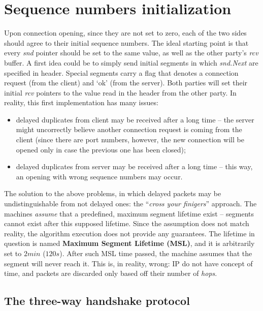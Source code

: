 \documentclass[a4paper, 11pt]{report}
\begin{document}
\section{Sequence numbers initialization}

Upon connection opening, since they are not set to zero, each of the two sides
should agree to their initial sequence numbers. The ideal starting point is
that every \emph{snd} pointer should be set to the same value, as well as the
other party's \emph{rcv} buffer. A first idea could be to simply send initial
segments in which \emph{snd.Next} are specified in header. Special segments
carry a flag that denotes a connection request (from the client) and `ok' (from
the server). Both parties will set their initial \emph{rcv} pointers to the
value read in the header from the other party. In reality, this first
implementation has many issues:
\begin{itemize}
    \item delayed duplicates from client may be received after a long time \---
        the server might uncorrectly believe another connection request is
        coming from the client (since there are port numbers, however, the new
        connection will be opened only in case the previous one has been
        closed);
    \item delayed duplicates from server may be received after a long time \---
        this way, an opening with wrong sequence numbers may occur.
\end{itemize}

The solution to the above problems, in which delayed packets may be
undistinguishable from not delayed ones: the ``\emph{cross your finigers}''
approach. The machines \emph{assume} that a predefined, maximum segment
lifetime exist \--- segments cannot exist after this supposed lifetime. Since
the assumption does not match reality, the algorithm execution does not provide
any guarantees. The lifetime in question is named \textbf{Maximum Segment
Lifetime (MSL)}, and it is arbitrarily set to $2 min$ ($120s$). After such MSL
time passed, the machine assumes that the segment will never reach it. This is,
in reality, wrong: IP do not have concept of time, and packets are discarded
only based off their number of \emph{hops}. 

\subsection{The three-way handshake protocol}
\end{document}

